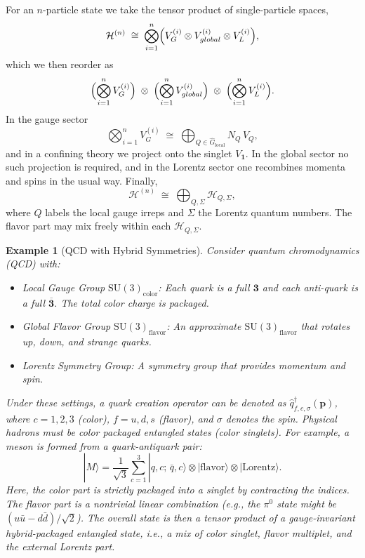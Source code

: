 \documentclass[12pt,a4paper]{article}
\newtheorem{example}{Example}
\begin{document}
For an $n$-particle state we take the tensor product of single-particle spaces,
\[
\mathcal{H}^{(n)}
\;\cong\;
\bigotimes_{i=1}^n
\Bigl(V_G^{(i)}\otimes V_{global}^{(i)}\otimes V_L^{(i)}\Bigr),
\]
which we then reorder as
\[
\Bigl(\bigotimes_{i=1}^nV_G^{(i)}\Bigr)
\;\otimes\;
\Bigl(\bigotimes_{i=1}^nV_{global}^{(i)}\Bigr)
\;\otimes\;
\Bigl(\bigotimes_{i=1}^nV_L^{(i)}\Bigr).
\]
In the gauge sector
\[
\bigotimes_{i=1}^nV_G^{(i)}
\;\cong\;
\bigoplus_{Q\in\widehat G_{\mathrm{local}}}N_Q\,V_Q,
\]
and in a confining theory we project onto the singlet $V_{\mathbf1}$.
In the global sector no such projection is required, and in the Lorentz sector one recombines momenta and spins in the usual way.
Finally,
\[
\mathcal{H}^{(n)}
\;\cong\;
\bigoplus_{Q,\Sigma}\mathcal{H}_{Q,\Sigma},
\]
where $Q$ labels the local gauge irreps and $\Sigma$ the Lorentz quantum numbers.
The flavor part may mix freely within each $\mathcal H_{Q,\Sigma}$.


\begin{example}[QCD with Hybrid Symmetries]
	Consider quantum chromodynamics (QCD) with:
	\begin{itemize}
		\item Local Gauge Group $\mathrm{SU}(3)_{\mathrm{color}}$:
		Each quark is a full $\mathbf{3}$ and each anti-quark is a full $\overline{\mathbf{3}}$.
		The total color charge is packaged.
		
		\item Global Flavor Group $\mathrm{SU}(3)_{\mathrm{flavor}}$:
		An approximate $\mathrm{SU}(3)_{\mathrm{flavor}}$ that rotates up, down, and strange quarks.
		
		\item Lorentz Symmetry Group:
		A symmetry group that provides momentum and spin.
	\end{itemize}	
	Under these settings, a quark creation operator can be denoted as $\hat{q}^\dagger_{f,c,\sigma}(\mathbf{p})$, where $c=1,2,3$ (color), $f=u,d,s$ (flavor), and $\sigma$ denotes the spin.
	Physical hadrons must be color packaged entangled states (color singlets).
	For example, a meson is formed from a quark-antiquark pair:
	\[
	|M\rangle = \frac{1}{\sqrt{3}} \sum_{c=1}^3 |q, c; \, \bar{q}, c \rangle \otimes |\text{flavor}\rangle \otimes |\text{Lorentz}\rangle.
	\]
	Here, the color part is strictly packaged into a singlet by contracting the indices.
	The flavor part is a nontrivial linear combination (e.g., the $\pi^0$ state might be $(u\bar{u} - d\bar{d})/\sqrt{2}$).
	The overall state is then a tensor product of a gauge-invariant hybrid-packaged entangled state, i.e., a mix of color singlet, flavor multiplet, and the external Lorentz part.
\end{example}
\end{document}
